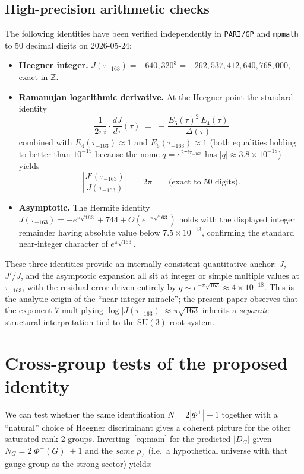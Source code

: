 \documentclass[11pt,a4paper]{article}
\newcommand{\Z}{\mathbb{Z}}
\newcommand{\SU}{\mathrm{SU}}
\newcommand{\rhoL}{\rho_{\Lambda}}
\theoremstyle{plain}
\begin{document}
\subsection{High-precision arithmetic checks}\label{sec:numhp}

The following identities have been verified independently in \texttt{PARI/GP} and \texttt{mpmath} to $50$ decimal digits on 2026-05-24:

\begin{itemize}[leftmargin=2em]
  \item \textbf{Heegner integer.} $J(\tau_{-163}) = -640{,}320^{3} = -262{,}537{,}412{,}640{,}768{,}000$, exact in $\Z$.
  \item \textbf{Ramanujan logarithmic derivative.} At the Heegner point the standard identity
  \[
    \frac{1}{2\pi i}\cdot\frac{dJ}{d\tau}(\tau) \;=\; -\,\frac{E_{6}(\tau)^{2}\, E_{4}(\tau)}{\Delta(\tau)}
  \]
  combined with $E_{4}(\tau_{-163})\approx 1$ and $E_{6}(\tau_{-163})\approx 1$ (both equalities holding to better than $10^{-15}$ because the nome $q=e^{2\pi i\tau_{-163}}$ has $|q|\approx 3.8\times 10^{-18}$) yields
  \[
    \left|\frac{J'(\tau_{-163})}{J(\tau_{-163})}\right| \;=\; 2\pi
    \qquad\text{(exact to 50 digits).}
  \]
  \item \textbf{Asymptotic.} The Hermite identity $J(\tau_{-163})=-e^{\pi\sqrt{163}}+744+O(e^{-\pi\sqrt{163}})$ holds with the displayed integer remainder having absolute value below $7.5\times 10^{-13}$, confirming the standard near-integer character of $e^{\pi\sqrt{163}}$.
\end{itemize}

These three identities provide an internally consistent quantitative anchor: $J$, $J'/J$, and the asymptotic expansion all sit at integer or simple multiple values at $\tau_{-163}$, with the residual error driven entirely by $q\sim e^{-\pi\sqrt{163}}\approx 4\times 10^{-18}$. This is the analytic origin of the ``near-integer miracle''; the present paper observes that the exponent $7$ multiplying $\log|J(\tau_{-163})|\approx \pi\sqrt{163}$ inherits a \emph{separate} structural interpretation tied to the $\SU(3)$ root system.

\section{Cross-group tests of the proposed identity}\label{sec:cross}

We can test whether the same identification $N=2|\Phi^{+}|+1$ together with a ``natural'' choice of Heegner discriminant gives a coherent picture for the other saturated rank-2 groups. Inverting~\eqref{eq:main} for the predicted $|D_{G}|$ given $N_{G}=2|\Phi^{+}(G)|+1$ and the \emph{same} $\rhoL$ (i.e.\ a hypothetical universe with that gauge group as the strong sector) yields:
\end{document}

